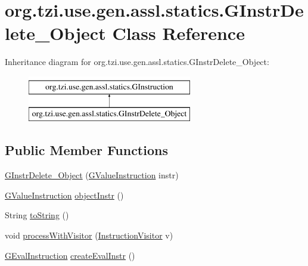 \hypertarget{classorg_1_1tzi_1_1use_1_1gen_1_1assl_1_1statics_1_1_g_instr_delete___object}{\section{org.\-tzi.\-use.\-gen.\-assl.\-statics.\-G\-Instr\-Delete\-\_\-\-Object Class Reference}
\label{classorg_1_1tzi_1_1use_1_1gen_1_1assl_1_1statics_1_1_g_instr_delete___object}
}
Inheritance diagram for org.\-tzi.\-use.\-gen.\-assl.\-statics.\-G\-Instr\-Delete\-\_\-\-Object\-:\begin{figure}[H]
\begin{center}
\leavevmode
\includegraphics[height=2.000000cm]{classorg_1_1tzi_1_1use_1_1gen_1_1assl_1_1statics_1_1_g_instr_delete___object}
\end{center}
\end{figure}
\subsection*{Public Member Functions}
\begin{DoxyCompactItemize}
\item 
\hyperlink{classorg_1_1tzi_1_1use_1_1gen_1_1assl_1_1statics_1_1_g_instr_delete___object_a1460c7463f5a3fed8a65a01ae64a3a5d}{G\-Instr\-Delete\-\_\-\-Object} (\hyperlink{interfaceorg_1_1tzi_1_1use_1_1gen_1_1assl_1_1statics_1_1_g_value_instruction}{G\-Value\-Instruction} instr)
\item 
\hyperlink{interfaceorg_1_1tzi_1_1use_1_1gen_1_1assl_1_1statics_1_1_g_value_instruction}{G\-Value\-Instruction} \hyperlink{classorg_1_1tzi_1_1use_1_1gen_1_1assl_1_1statics_1_1_g_instr_delete___object_a2d5735cb9944b595b058ee7dc1c51cad}{object\-Instr} ()
\item 
String \hyperlink{classorg_1_1tzi_1_1use_1_1gen_1_1assl_1_1statics_1_1_g_instr_delete___object_a3da68fa56c9e3123408882113ad852d6}{to\-String} ()
\item 
void \hyperlink{classorg_1_1tzi_1_1use_1_1gen_1_1assl_1_1statics_1_1_g_instr_delete___object_a6f056dfc0e8e00e678c32c0cf841f294}{process\-With\-Visitor} (\hyperlink{interfaceorg_1_1tzi_1_1use_1_1gen_1_1assl_1_1statics_1_1_instruction_visitor}{Instruction\-Visitor} v)
\item 
\hyperlink{classorg_1_1tzi_1_1use_1_1gen_1_1assl_1_1dynamics_1_1_g_eval_instruction}{G\-Eval\-Instruction} \hyperlink{classorg_1_1tzi_1_1use_1_1gen_1_1assl_1_1statics_1_1_g_instr_delete___object_a52e14c8475b51c13444259d7e9df8ac4}{create\-Eval\-Instr} ()
\end{DoxyCompactItemize}


